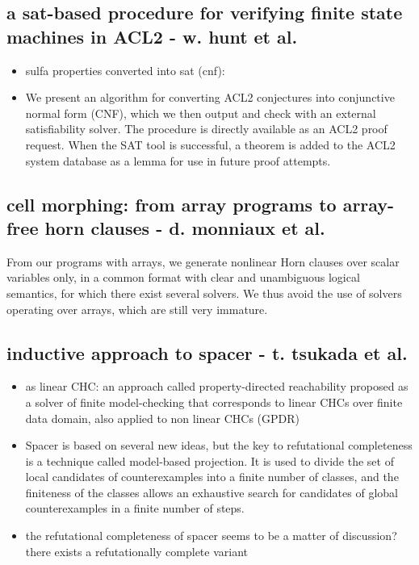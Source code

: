 \documentclass[]{article}
\begin{document}
\subsection{a sat-based procedure for verifying finite state machines in ACL2 - w. hunt et al.}
\begin{itemize}
    \item sulfa properties converted into sat (cnf): 
    \item We present an algorithm for converting ACL2 conjectures into conjunctive normal form (CNF),
        which we then output and check with an external satisfiability solver. 
        The procedure is directly available as an ACL2 proof request. 
        When the SAT tool is successful, a theorem  is added to the ACL2 system database as a lemma for use
        in future proof attempts. 
\end{itemize}

\subsection{cell morphing: from array programs to array-free horn clauses - d. monniaux et al.}

From our programs with arrays, we generate nonlinear Horn clauses over scalar variables only,
    in a common format with clear and unambiguous logical semantics, for which there exist several
    solvers. We thus avoid the use of solvers operating over arrays, which are still very immature.

\subsection{inductive approach to spacer - t. tsukada et al.}

\begin{itemize}
    \item as linear CHC: an approach called property-directed reachability proposed as a solver of finite model-checking 
    that corresponds to linear CHCs over finite data domain, also applied to non linear CHCs (GPDR)
    \item Spacer is based on several new ideas, but the key to refutational completeness is a technique 
    called model-based projection. It is used to divide the set of local candidates
    of counterexamples into a finite number of classes, and the finiteness of the classes allows an
    exhaustive search for candidates of global counterexamples in a finite number of steps.
    \item the refutational completeness of spacer seems to be a matter of discussion? there exists a refutationally
    complete variant
\end{itemize}
\end{document}
